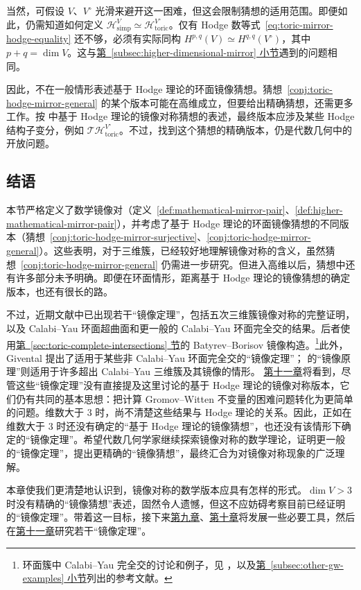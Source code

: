 当然，可假设 $V$、$V^\circ$ 光滑来避开这一困难，但这会限制猜想的适用范围。即便如此，仍需知道如何定义 $\mathcal H^V_{\mathrm{simp}}\simeq\mathcal H^{V^\circ}_{\mathrm{toric}}$。仅有 Hodge 数等式~\eqref{eq:toric-mirror-hodge-equality} 还不够，必须有实际同构 $H^{p,q}(V)\simeq H^{q,q}(V^\circ)$，其中 $p+q=\dim V$。这与\hyperref[subsec:higher-dimensional-mirror]{第~\ref*{subsec:higher-dimensional-mirror} 小节}遇到的问题相同。

因此，不在一般情形表述基于 Hodge 理论的环面镜像猜想。猜想~\ref{conj:toric-hodge-mirror-general} 的某个版本可能在高维成立，但要给出精确猜想，还需更多工作。按  中基于 Hodge 理论的镜像对称猜想的表述，最终版本应涉及某些 Hodge 结构子变分，例如 $\mathcal T\mathcal H^{V^\circ}_{\mathrm{toric}}$。不过，找到这个猜想的精确版本，仍是代数几何中的开放问题。

\subsection{结语}\label{subsec:mirror-conjecture-conclusion}
本节严格定义了数学镜像对（定义~\ref{def:mathematical-mirror-pair}、\ref{def:higher-mathematical-mirror-pair}），并考虑了基于 Hodge 理论的环面镜像猜想的不同版本（猜想~\ref{conj:toric-hodge-mirror-surjective}、\ref{conj:toric-hodge-mirror-general}）。这些表明，对于三维簇，已经较好地理解镜像对称的含义，虽然猜想~\ref{conj:toric-hodge-mirror-general} 仍需进一步研究。但进入高维以后，猜想中还有许多部分未予明确。即便在环面情形，距离基于 Hodge 理论的镜像猜想的确定版本，也还有很长的路。

不过，近期文献中已出现若干“镜像定理”，包括五次三维簇镜像对称的完整证明，以及 Calabi--Yau 环面超曲面和更一般的 Calabi--Yau 环面完全交的结果。后者使用\hyperref[sec:toric-complete-intersections]{第~\ref*{sec:toric-complete-intersections} 节}的 Batyrev--Borisov 镜像构造。\footnote{环面簇中 Calabi--Yau 完全交的讨论和例子，见 ，以及\hyperref[subsec:other-gw-examples]{第~\ref*{subsec:other-gw-examples} 小节}列出的参考文献。}此外，Givental 提出了适用于某些非 Calabi--Yau 环面完全交的“镜像定理”； 的“镜像原理”则适用于许多超出 Calabi--Yau 三维簇及其镜像的情形。
\hyperref[chap:mirror-theorem]{第十一章}将看到，尽管这些“镜像定理”没有直接提及这里讨论的基于 Hodge 理论的镜像对称版本，它们仍有共同的基本思想：把计算 Gromov--Witten 不变量的困难问题转化为更简单的问题。维数大于 $3$ 时，尚不清楚这些结果与 Hodge 理论的关系。因此，正如在维数大于 $3$ 时还没有确定的“基于 Hodge 理论的镜像猜想”，也还没有该情形下确定的“镜像定理”。希望代数几何学家继续探索镜像对称的数学理论，证明更一般的“镜像定理”，提出更精确的“镜像猜想”，最终汇合为对镜像对称现象的广泛理解。

本章使我们更清楚地认识到，镜像对称的数学版本应具有怎样的形式。$\dim V>3$ 时没有精确的“镜像猜想”表述，固然令人遗憾，但这不应妨碍考察目前已经证明的“镜像定理”。带着这一目标，接下来\hyperref[chap:localization]{第九章}、\hyperref[chap:quantum-differential-equations]{第十章}将发展一些必要工具，然后在\hyperref[chap:mirror-theorem]{第十一章}研究若干“镜像定理”。
